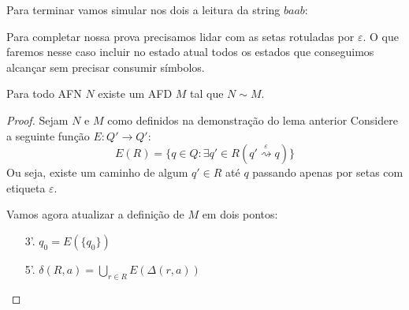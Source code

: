 \begin{example}
Para terminar vamos simular nos dois a leitura da string $baab$:

\begin{multicols}{2}

\begin{center}
\end{center}
\columnbreak

\begin{center}
\end{center}
\end{multicols}
\end{example}

Para completar nossa prova precisamos lidar com as setas rotuladas por $\varepsilon$.
O que faremos nesse caso incluir no estado atual todos os estados que conseguimos alcançar sem precisar consumir símbolos.


\begin{theorem}
  Para todo AFN $N$ existe um AFD $M$ tal que $N \sim M$.
\end{theorem}
\begin{proof}
  Sejam $N$ e $M$ como definidos na demonstração do lema anterior
  Considere a seguinte função $E: Q' \to Q'$:
  \begin{displaymath}
    E(R) = \{q \in Q: \exists q' \in R(q' \stackrel{\varepsilon}{\rightsquigarrow} q) \}
  \end{displaymath}
  Ou seja, existe um caminho de algum $q' \in R$ até $q$ passando apenas por setas com etiqueta $\varepsilon$.

  Vamos agora atualizar a definição de $M$ em dois pontos:

  \begin{enumerate}
  \item[3'.] $q_0 = E(\{q_0\})$
  \item[5'.] $\delta(R,a) = \bigcup_{r \in R} E(\Delta(r,a))$
  \end{enumerate}
\end{proof}


